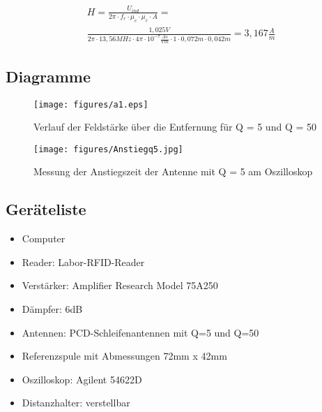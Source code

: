 \documentclass[12pt,a4paper,ngerman]{article}
\begin{document}
\begin{gather}
H = \frac{U_{ind}}{2\pi \cdot f_r \cdot \mu_e \cdot \mu_r \cdot A} = \\
\frac{1,025V}{2\pi \cdot 13,56MHz \cdot 4\pi \cdot 10^{-7}\frac{As}{Vm} \cdot 1 \cdot 0,072m \cdot 0,042m} = 3,167\frac{A}{m}
\end{gather}

\subsection{Diagramme}
\begin{figure}[H]
\centering
\texttt{[image: figures/a1.eps]} 
\caption{Verlauf der Feldstärke über die Entfernung für Q = 5 und Q = 50}
\label{fig:1_q5}
\end{figure}

\begin{figure}[H]
\centering
\texttt{[image: figures/Anstiegq5.jpg]} 
\caption{Messung der Anstiegszeit der Antenne mit Q = 5 am Oszilloskop}
\label{fig:1_anstieg}
\end{figure}

\subsection{Geräteliste}
\begin{itemize}
\item Computer
\item Reader: Labor-RFID-Reader
\item Verstärker: Amplifier Research Model 75A250
\item Dämpfer: 6dB
\item Antennen: PCD-Schleifenantennen mit Q=5 und Q=50
\item Referenzspule mit Abmessungen 72mm x 42mm
\item Oszilloskop: Agilent 54622D
\item Distanzhalter: verstellbar
\end{itemize}
\pagebreak
\end{document}
